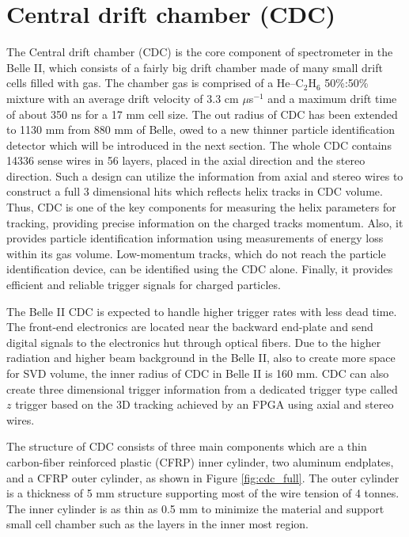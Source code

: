 \section{Central drift chamber (CDC)}
The Central drift chamber (CDC) is the core component of spectrometer in the Belle II, which consists of a fairly big drift chamber made of many small drift cells filled with gas. The chamber
gas is comprised of a He–C$_2$H$_6$ 50\%:50\% mixture with an average drift velocity of 3.3 cm $\mu$s$^{-1}$ and a
maximum drift time of about 350 ns for a 17 mm cell size.
The out radius of CDC has been extended to 1130 mm from 880 mm of Belle, owed to a new thinner particle identification detector which will be introduced in the next section. The whole CDC contains 14336 sense wires in 56 layers, placed in the axial direction and the stereo direction\cite{Abe:2010gxa}\cite{b2book}. Such a design can utilize the information from axial and stereo wires to construct a full 3 dimensional hits which reflects helix tracks in CDC volume. Thus, CDC is one of the key components for measuring the helix parameters for tracking, providing precise information on the charged tracks momentum. Also, it provides particle identification information using measurements of energy loss within its gas volume. Low-momentum tracks, which do not reach the particle identification device, can be identified using
the CDC alone. Finally, it provides efficient and reliable trigger signals for charged particles.

The Belle II CDC is expected to handle higher trigger rates with less dead time. The front-end electronics are located near the backward end-plate and send digital signals to the
electronics hut through optical fibers. Due to the higher radiation and higher beam background in the Belle II, also to create more space for SVD volume, the inner radius of CDC in Belle II is 160 mm. CDC can also create three dimensional trigger information from a dedicated trigger type called $z$ trigger\cite{Abe:2010gxa} based on the 3D tracking achieved by an FPGA using axial and stereo wires.

The structure of CDC consists of three main components which are a thin carbon-fiber reinforced
plastic (CFRP) inner cylinder, two aluminum endplates, and a CFRP outer cylinder, as shown in Figure \ref{fig:cdc_full}. The outer cylinder is a thickness of 5 mm structure supporting most of the wire tension of 4 tonnes. The inner cylinder is as thin as 0.5 mm to minimize the material and support small cell chamber such as the layers in the inner most region. 

